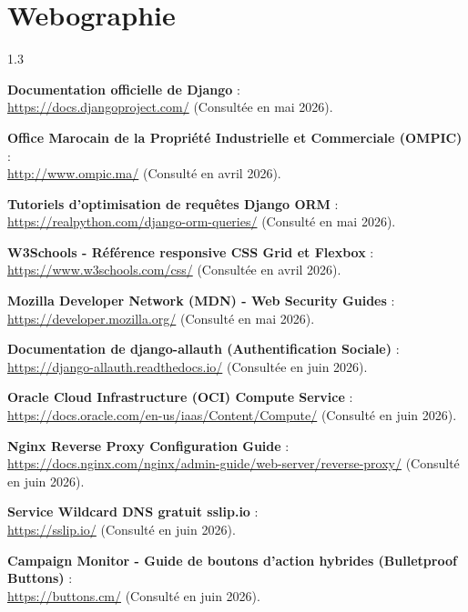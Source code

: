 \section*{Webographie}
\begin{spacing}{1.3}
\begin{enumerate}[label={[W\arabic*]}]
    \item \textbf{Documentation officielle de Django} : \\ \url{https://docs.djangoproject.com/} (Consultée en mai 2026).
    \item \textbf{Office Marocain de la Propriété Industrielle et Commerciale (OMPIC)} : \\ \url{http://www.ompic.ma/} (Consulté en avril 2026).
    \item \textbf{Tutoriels d'optimisation de requêtes Django ORM} : \\ \url{https://realpython.com/django-orm-queries/} (Consulté en mai 2026).
    \item \textbf{W3Schools - Référence responsive CSS Grid et Flexbox} : \\ \url{https://www.w3schools.com/css/} (Consultée en avril 2026).
    \item \textbf{Mozilla Developer Network (MDN) - Web Security Guides} : \\ \url{https://developer.mozilla.org/} (Consulté en mai 2026).
    \item \textbf{Documentation de django-allauth (Authentification Sociale)} : \\ \url{https://django-allauth.readthedocs.io/} (Consultée en juin 2026).
    \item \textbf{Oracle Cloud Infrastructure (OCI) Compute Service} : \\ \url{https://docs.oracle.com/en-us/iaas/Content/Compute/} (Consulté en juin 2026).
    \item \textbf{Nginx Reverse Proxy Configuration Guide} : \\ \url{https://docs.nginx.com/nginx/admin-guide/web-server/reverse-proxy/} (Consulté en juin 2026).
    \item \textbf{Service Wildcard DNS gratuit sslip.io} : \\ \url{https://sslip.io/} (Consulté en juin 2026).
    \item \textbf{Campaign Monitor - Guide de boutons d'action hybrides (Bulletproof Buttons)} : \\ \url{https://buttons.cm/} (Consulté en juin 2026).
\end{enumerate}
\end{spacing}
\newpage
